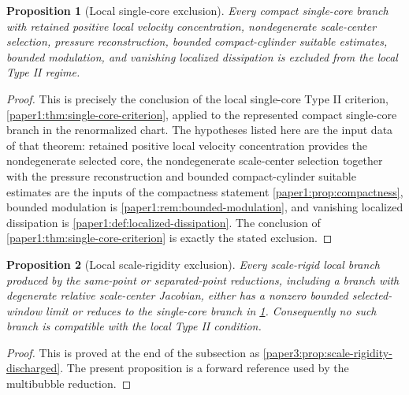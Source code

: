 \documentclass[11pt]{amsart}
\theoremstyle{plain}
\newtheorem{proposition}[proposition]{Proposition}
\theoremstyle{definition}
\theoremstyle{remark}
\begin{document}
\begin{proposition}[Local single-core exclusion]\label{paper3:prop:local-single-core-exclusion}
Every compact single-core branch with retained positive local velocity concentration,
nondegenerate scale-center selection, pressure reconstruction, bounded
compact-cylinder suitable estimates, bounded modulation, and vanishing localized
dissipation is excluded from the local Type II regime.
\end{proposition}

\begin{proof}
This is precisely the conclusion of the local single-core Type II criterion,
\cref{paper1:thm:single-core-criterion}, applied to the represented compact
single-core branch in the renormalized chart.  The hypotheses listed here are
the input data of that theorem: retained positive local velocity concentration provides the
nondegenerate selected core, the nondegenerate scale-center selection together
with the pressure reconstruction and bounded compact-cylinder suitable
estimates are the inputs of the compactness statement
\cref{paper1:prop:compactness}, bounded modulation is
\cref{paper1:rem:bounded-modulation}, and vanishing localized dissipation is
\cref{paper1:def:localized-dissipation}.  The conclusion of
\cref{paper1:thm:single-core-criterion} is exactly the stated exclusion.
\end{proof}

\begin{proposition}[Local scale-rigidity exclusion]\label{paper3:prop:local-scale-rigidity-exclusion}
Every scale-rigid local branch produced by the same-point or separated-point
reductions, including a branch with degenerate relative scale-center Jacobian,
either has a nonzero bounded selected-window limit or reduces to the single-core
branch in \cref{paper3:prop:local-single-core-exclusion}.  Consequently no such branch is compatible
with the local Type II condition.
\end{proposition}

\begin{proof}
This is proved at the end of the subsection as
\cref{paper3:prop:scale-rigidity-discharged}.  The present proposition is a
forward reference used by the multibubble reduction.
\end{proof}
\end{document}
